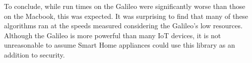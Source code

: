 To conclude, while run times on the Galileo were significantly worse than those on the Macbook, this was expected.  It was surprising to find that many of these algorithms ran at the speeds measured considering the Galileo's low resources. Although the Galileo is more powerful than many IoT devices, it is not unreasonable to assume Smart Home appliances could use this library as an addition to security.